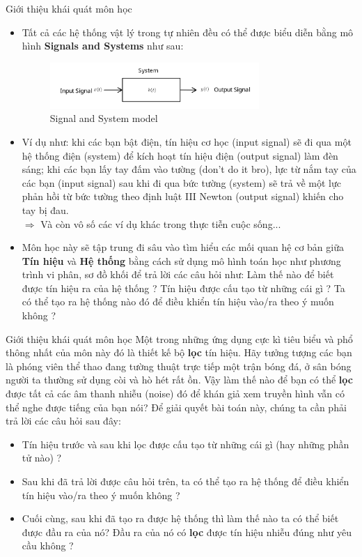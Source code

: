 \documentclass[8pt]{beamer}
\begin{document}
\begin{frame}{Giới thiệu khái quát môn học}
\begin{itemize}
	\item Tất cả các hệ thống vật lý trong tự nhiên đều có thể được biểu diễn bằng mô hình \textbf{Signals and Systems} như sau:
		\begin{figure}[h]
			\includegraphics[width=0.75\textwidth]{model.png}
			\caption{Signal and System model}
			\label{fig:re2}
		\end{figure}
	\item Ví dụ như: khi các bạn bật điện, tín hiệu cơ học (input signal) sẽ đi qua một hệ thống điện (system) để kích hoạt tín hiệu điện (output signal) làm đèn sáng; khi các bạn lấy tay 
đấm vào tường (don't do it bro), lực từ nắm tay của các bạn (input signal) sau khi đi qua bức tường (system) sẽ trả về một lực phản hồi từ bức tường theo định luật III Newton (output signal) khiến cho tay bị đau. \\	$\Rightarrow$ Và còn vô số các ví dụ khác trong thực tiễn cuộc sống...
\item Môn học này sẽ tập trung đi sâu vào tìm hiểu các mối quan hệ cơ bản giữa \textbf{Tín hiệu} và \textbf{Hệ thống} bằng cách sử dụng mô hình toán học như phương trình vi phân, sơ đồ khối để trả lời các câu hỏi như: Làm thế nào để biết được tín hiệu ra của hệ thống ? Tín hiệu được cấu tạo từ những cái gì ? Ta có thể tạo ra hệ thống nào đó để điều khiển tín hiệu vào/ra theo ý muốn không ?
\end{itemize}
\end{frame}
\begin{frame}{Giới thiệu khái quát môn học}
	Một trong những ứng dụng cực kì tiêu biểu và phổ thông nhất của môn này đó là thiết kế bộ \textbf{lọc} tín hiệu. Hãy tưởng tượng các bạn là phóng viên thể thao đang tường thuật trực tiếp một trận bóng đá, ở sân bóng người ta thường sử dụng còi và hò hét rất ồn. Vậy làm thế nào để bạn có thể \textbf{lọc} được tất cả các âm thanh nhiễu (noise) đó để khán giả xem truyền hình vẫn có thể nghe được tiếng của bạn nói? Để giải quyết bài toán này, chúng ta cần phải trả lời các câu hỏi sau đây:
	\begin{itemize}
		\item Tín hiệu trước và sau khi lọc được cấu tạo từ những cái gì (hay những phần tử nào) ?
		\item Sau khi đã trả lời được câu hỏi trên, ta có thể tạo ra hệ thống để điều khiển tín hiệu vào/ra theo ý muốn không ?
		\item Cuối cùng, sau khi đã tạo ra được hệ thống thì làm thế nào ta có thể biết được đầu ra của nó? Đầu ra của nó có \textbf{lọc} được tín hiệu nhiễu đúng như yêu cầu không ?
	\end{itemize}
\end{frame}
\end{document}
